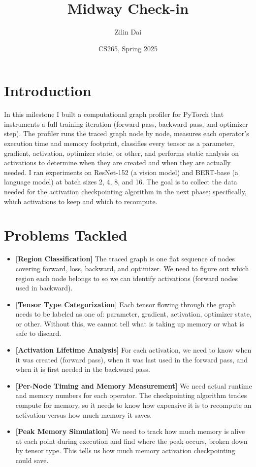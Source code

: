 \documentclass[11pt]{article}
\title{Midway Check-in}
\author{Zilin Dai}
\date{CS265, Spring 2025}
\begin{document}
\maketitle

\section{Introduction}

In this milestone I built a computational graph profiler for PyTorch that instruments a full training iteration (forward pass, backward pass, and optimizer step). The profiler runs the traced graph node by node, measures each operator's execution time and memory footprint, classifies every tensor as a parameter, gradient, activation, optimizer state, or other, and performs static analysis on activations to determine when they are created and when they are actually needed. I ran experiments on ResNet-152 (a vision model) and BERT-base (a language model) at batch sizes 2, 4, 8, and 16. The goal is to collect the data needed for the activation checkpointing algorithm in the next phase: specifically, which activations to keep and which to recompute.

\section{Problems Tackled}

\begin{itemize}
  \item \textbf{[Region Classification]} The traced graph is one flat sequence of nodes covering forward, loss, backward, and optimizer. We need to figure out which region each node belongs to so we can identify activations (forward nodes used in backward).

  \item \textbf{[Tensor Type Categorization]} Each tensor flowing through the graph needs to be labeled as one of: parameter, gradient, activation, optimizer state, or other. Without this, we cannot tell what is taking up memory or what is safe to discard.

  \item \textbf{[Activation Lifetime Analysis]} For each activation, we need to know when it was created (forward pass), when it was last used in the forward pass, and when it is first needed in the backward pass.

  \item \textbf{[Per-Node Timing and Memory Measurement]} We need actual runtime and memory numbers for each operator. The checkpointing algorithm trades compute for memory, so it needs to know how expensive it is to recompute an activation versus how much memory it saves.

  \item \textbf{[Peak Memory Simulation]} We need to track how much memory is alive at each point during execution and find where the peak occurs, broken down by tensor type. This tells us how much memory activation checkpointing could save.
\end{itemize}
\end{document}
